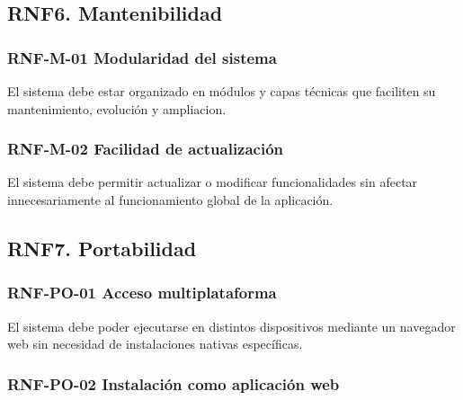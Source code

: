 \subsection{RNF6. Mantenibilidad}

\vspace{-0.75em}
\subsubsection{RNF-M-01 Modularidad del sistema}
\vspace{-1em}

El sistema debe estar organizado en módulos y capas técnicas que faciliten su mantenimiento, evolución y ampliacion.

\vspace{-0.75em}
\subsubsection{RNF-M-02 Facilidad de actualización}
\vspace{-1em}

El sistema debe permitir actualizar o modificar funcionalidades sin afectar innecesariamente al funcionamiento global de la aplicación.

\subsection{RNF7. Portabilidad}

\vspace{-0.75em}
\subsubsection{RNF-PO-01 Acceso multiplataforma}
\vspace{-1em}

El sistema debe poder ejecutarse en distintos dispositivos mediante un navegador web sin necesidad de instalaciones nativas específicas.

\vspace{-0.75em}
\subsubsection{RNF-PO-02 Instalación como aplicación web}
\vspace{-1em}

